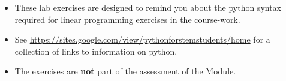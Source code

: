 \documentclass[12pt,a4paper]{article}
\begin{document}
\sffamily 




\begin{itemize}

\item These lab exercises are designed to remind you about the python syntax
      required for linear programming exercises in the course-work.

\item See
       \url{https://sites.google.com/view/pythonforstemstudents/home}
       for a collection of links to information on python.


\item The exercises are \textbf{not} part of the assessment of the Module.

\end{itemize}

\newpage
\thispagestyle{empty}
\addtocounter{section}{0} %


 
 
 
 
 
\end{document}
